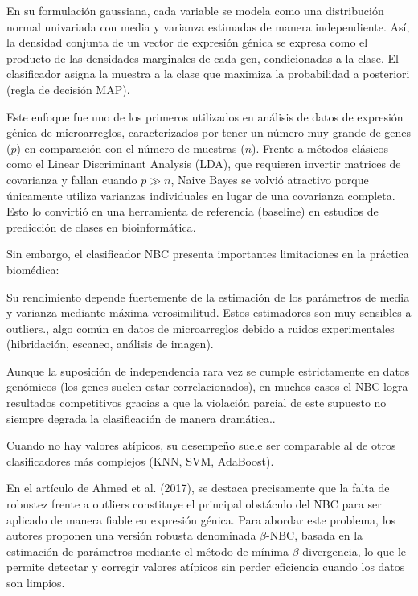 \documentclass[11pt,a4paper,spanish]{book}
\numberwithin{equation}{chapter}
\numberwithin{figure}{chapter}
\begin{document}
En su formulación gaussiana, cada variable se modela como una distribución normal univariada con media y varianza estimadas de manera independiente. Así, la densidad conjunta de un vector de expresión génica se expresa como el producto de las densidades marginales de cada gen, condicionadas a la clase. El clasificador asigna la muestra a la clase que maximiza la probabilidad a posteriori (regla de decisión MAP)\cite{rish2001,dudoit2002,Libbrecht2015}.

Este enfoque fue uno de los primeros utilizados en análisis de datos de expresión génica de microarreglos, caracterizados por tener un número muy grande de genes ($p$) en comparación con el número de muestras ($n$). Frente a métodos clásicos como el Linear Discriminant Analysis (LDA), que requieren invertir matrices de covarianza y fallan cuando $p \gg n$, Naive Bayes se volvió atractivo porque únicamente utiliza varianzas individuales en lugar de una covarianza completa. Esto lo convirtió en una herramienta de referencia (baseline) en estudios de predicción de clases en bioinformática\cite{Libbrecht2015}\cite{dudoit2002}\cite{rish2001}.

Sin embargo, el clasificador NBC presenta importantes limitaciones en la práctica biomédica:

Su rendimiento depende fuertemente de la estimación de los parámetros de media y varianza mediante máxima verosimilitud. Estos estimadores son muy sensibles a outliers\cite{rish2001}., algo común en datos de microarreglos debido a ruidos experimentales (hibridación, escaneo, análisis de imagen)\cite{dudoit2002,Libbrecht2015}.

Aunque la suposición de independencia rara vez se cumple estrictamente en datos genómicos (los genes suelen estar correlacionados), en muchos casos el NBC logra resultados competitivos gracias a que la violación parcial de este supuesto no siempre degrada la clasificación de manera dramática\cite{rish2001,dudoit2002,Libbrecht2015}..

Cuando no hay valores atípicos, su desempeño suele ser comparable al de otros clasificadores más complejos (KNN, SVM, AdaBoost).

En el artículo de Ahmed et al. (2017), se destaca precisamente que la falta de robustez frente a outliers constituye el principal obstáculo del NBC para ser aplicado de manera fiable en expresión génica. Para abordar este problema, los autores proponen una versión robusta denominada $\beta$-NBC, basada en la estimación de parámetros mediante el método de mínima $\beta$-divergencia, lo que le permite detectar y corregir valores atípicos sin perder eficiencia cuando los datos son limpios.\cite{Saglam2017}
\end{document}
